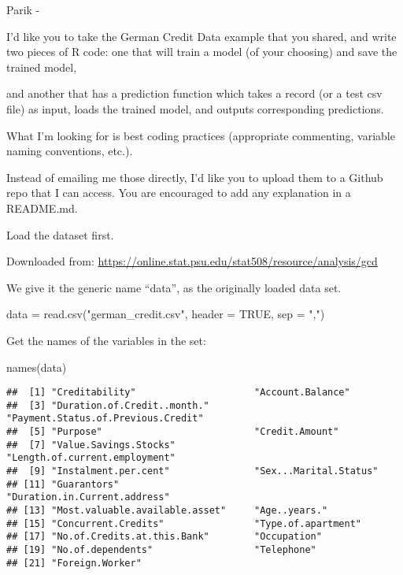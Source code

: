 \documentclass[
]{article}
\author{}
\date{\vspace{-2.5em}}
\newenvironment{Shaded}{\begin{snugshade}}{\end{snugshade}}
\newcommand{\AttributeTok}[1]{\textcolor[rgb]{0.77,0.63,0.00}{#1}}
\newcommand{\ConstantTok}[1]{\textcolor[rgb]{0.00,0.00,0.00}{#1}}
\newcommand{\FunctionTok}[1]{\textcolor[rgb]{0.00,0.00,0.00}{#1}}
\newcommand{\NormalTok}[1]{#1}
\newcommand{\OtherTok}[1]{\textcolor[rgb]{0.56,0.35,0.01}{#1}}
\newcommand{\StringTok}[1]{\textcolor[rgb]{0.31,0.60,0.02}{#1}}
\begin{document}
Parik -

I'd like you to take the German Credit Data example that you shared, and
write two pieces of R code: one that will train a model (of your
choosing) and save the trained model,

and another that has a prediction function which takes a record (or a
test csv file) as input, loads the trained model, and outputs
corresponding predictions.

What I'm looking for is best coding practices (appropriate commenting,
variable naming conventions, etc.).

Instead of emailing me those directly, I'd like you to upload them to a
Github repo that I can access. You are encouraged to add any explanation
in a README.md.

Load the dataset first.

Downloaded from:
\url{https://online.stat.psu.edu/stat508/resource/analysis/gcd}

We give it the generic name ``data'', as the originally loaded data set.

\begin{Shaded}
\begin{Highlighting}[]
\NormalTok{data }\OtherTok{=} \FunctionTok{read.csv}\NormalTok{(}\StringTok{"german\_credit.csv"}\NormalTok{, }
                \AttributeTok{header =} \ConstantTok{TRUE}\NormalTok{, }
                \AttributeTok{sep =} \StringTok{","}\NormalTok{)}
\end{Highlighting}
\end{Shaded}

Get the names of the variables in the set:

\begin{Shaded}
\begin{Highlighting}[]
\FunctionTok{names}\NormalTok{(data)}
\end{Highlighting}
\end{Shaded}

\begin{verbatim}
##  [1] "Creditability"                     "Account.Balance"                  
##  [3] "Duration.of.Credit..month."        "Payment.Status.of.Previous.Credit"
##  [5] "Purpose"                           "Credit.Amount"                    
##  [7] "Value.Savings.Stocks"              "Length.of.current.employment"     
##  [9] "Instalment.per.cent"               "Sex...Marital.Status"             
## [11] "Guarantors"                        "Duration.in.Current.address"      
## [13] "Most.valuable.available.asset"     "Age..years."                      
## [15] "Concurrent.Credits"                "Type.of.apartment"                
## [17] "No.of.Credits.at.this.Bank"        "Occupation"                       
## [19] "No.of.dependents"                  "Telephone"                        
## [21] "Foreign.Worker"
\end{verbatim}
\end{document}
